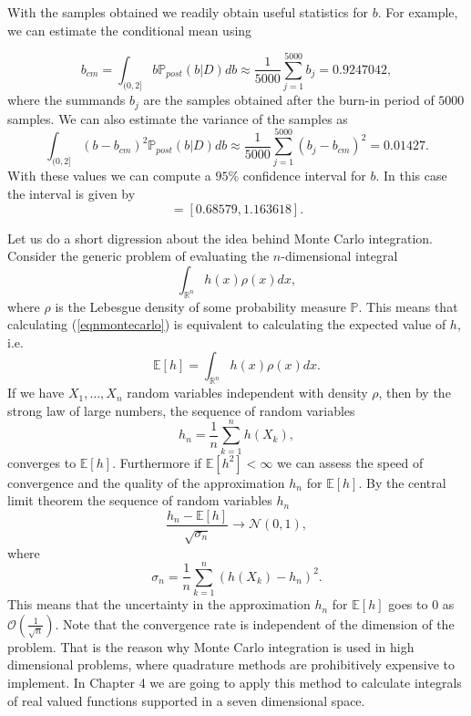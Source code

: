 \documentclass[12pt]{book}
\newcommand{\post}{\mathbb{P}_{post}}
\newcommand{\p}{\mathbb{P}}
\begin{document}
With the samples obtained we readily obtain useful statistics for $b$. For example, we can estimate
the conditional mean using \cite{casella2008monte}

\begin{equation}\label{eqnbcmMC}
b_{cm}=\int_{(0,2]}b\post(b|D)db\approx\frac{1}{5000}\sum_{j=1}^{5000}b_{j}=0.9247042,
\end{equation}
where the summands $b_{j}$ are the samples obtained after the burn-in period of $5000$ samples. We can 
also estimate the variance of the samples as
\begin{equation*}
\int_{(0,2]}(b-b_{cm})^{2}\post(b|D)db\approx\frac{1}{5000}\sum_{j=1}^{5000}(b_{j}-b_{cm})^{2}=0.01427.
\end{equation*}
With these values we can compute a $95\%$ confidence interval for $b$. In this
case the interval is given by 
\begin{equation*}
[0.9247042-2\sqrt{0.01427},0.92470422+2\sqrt{0.01427}]=[0.68579,1.163618].
\end{equation*}


Let us do a short digression about the idea behind Monte Carlo integration. 
Consider the generic problem of evaluating the $n$-dimensional
integral
\begin{equation}\label{eqnmontecarlo}
\int_{\mathbb{R}^{n}}h(x)\rho(x)dx,
\end{equation}  
where $\rho$ is the Lebesgue density of some probability measure $\p$. This means that calculating (\ref{eqnmontecarlo}) 
is equivalent to calculating the expected value of $h$, i.e.
\begin{equation*}
\mathbb{E}[h]=\int_{\mathbb{R}^{n}}h(x)\rho(x)dx.
\end{equation*}
If we have $X_{1},\ldots,X_{n}$ random variables independent with density $\rho$, then by the strong law of large numbers, the sequence of random
variables
\begin{equation*}
h_{n}=\frac{1}{n}\sum_{k=1}^{n} h(X_{k}),
\end{equation*}
converges to $\mathbb{E}[h]$\cite{dudley2002real}. Furthermore if $\mathbb{E}[h^{2}]<\infty$ we can assess the speed of
convergence and the quality of the approximation $h_{n}$ for $\mathbb{E}[h]$. By the central limit theorem
the sequence of random  variables $h_{n}$
\begin{equation*}
\frac{h_{n}-\mathbb{E}[h]}{\sqrt{\sigma_{n}}}\rightarrow \mathcal{N}(0,1),
\end{equation*}
where 
\begin{equation*}
\sigma_{n}=\frac{1}{n}\sum_{k=1}^{n}(h(X_{k})-h_{n})^{2}.
\end{equation*}
This means that the uncertainty in the approximation $h_{n}$ for $\mathbb{E}[h]$ goes to $0$ as $\mathcal{O}(\frac{1}{\sqrt{n}})$.
Note that the convergence rate is independent of the dimension of the problem. That is the reason why Monte Carlo integration
is used in high dimensional problems, where quadrature methods are prohibitively  expensive to implement. In Chapter 4 we are going to apply 
this method to calculate integrals of real valued functions supported in a seven dimensional space.
\end{document}
